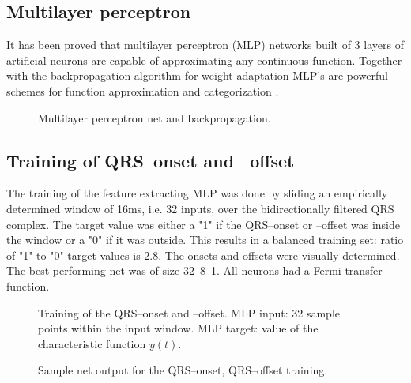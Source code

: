 \documentclass[twocolumn]{cinc}
\begin{document}
\subsection{Multilayer perceptron}

It has been proved that multilayer perceptron (MLP) networks built of 3 layers
of artificial neurons are capable of approximating any continuous function.
Together with the backpropagation algorithm for weight adaptation MLP's
are powerful schemes for function approximation and categorization \cite{nn:haykin99}.
\begin{figure}[ht]
\vspace {-.5cm} 
\centerline{}
\vspace*{.5cm}
\centerline{\hspace*{0cm}}
\vspace{.3cm}
\caption{Multilayer perceptron net and backpropagation.}
\label{mlp1} \vspace*{-15mm} 
\end{figure}


\clearpage



\subsection{Training of QRS--onset and --offset}

The training of the feature extracting MLP was done by sliding an empirically
determined window of 16ms, i.e. 32 inputs, over the bidirectionally filtered QRS complex.
The target value was either a "1" if the QRS--onset or --offset was inside the window
or a  "0" if it was outside. This results in a balanced training set: ratio of "1" to "0" target values is 2.8.
The onsets and offsets were visually determined.
The best performing net was of size 32--8--1. All neurons
had a Fermi transfer function.
 
\begin{figure}[ht] 
\centerline{\hspace*{0cm}}
\vspace*{-3cm} 
\caption{Training of the QRS--onset and --offset. MLP input: 32 sample points within the
input window. MLP target: value of the characteristic function $y(t)$.}
\label{mlp2} \vspace*{3mm} 
\end{figure}
       
        
\begin{figure}[ht] 
\centerline{\hspace*{-5mm}}
\caption{Sample net output for the QRS--onset, QRS--offset training.}     
\label{mlp3} \vspace*{3mm} 
\end{figure}
\end{document}
